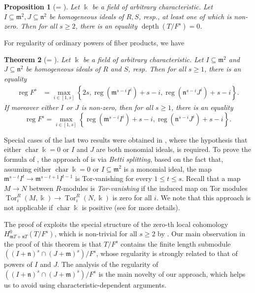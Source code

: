 \documentclass{amsart}
\DeclareMathOperator{\chara}{char}
\DeclareMathOperator{\depth}{depth}
\DeclareMathOperator{\reg}{reg}
\DeclareMathOperator{\Tor}{Tor}
\newcommand{\mm}{\mathfrak{m}}
\newcommand{\nn}{\mathfrak{n}}
\theoremstyle{plain}
\newtheorem{thm}{Theorem}[section]
\newtheorem{prop}[thm]{Proposition}
\theoremstyle{definition}
\numberwithin{equation}{section}
\newcommand{\kk}{\Bbbk}
\begin{document}
\begin{prop}[= ]
\label{prop_depthordinarypower_main}
Let $\kk$ be a field of arbitrary characteristic. Let $I\subseteq \mm^2, J\subseteq \nn^2$ be homogeneous ideals of $R,S$, resp., at least one of which is non-zero. Then for all $s\ge 2$, there is an equality $\depth(T/F^s)=0$.
\end{prop}

For regularity of ordinary powers of fiber products, we have

\begin{thm}[= ]
\label{thm_regordinarypow_main}
Let $\kk$ be a field of arbitrary characteristic. Let $I\subseteq \mm^2$ and $J\subseteq \nn^2$ be homogeneous ideals of $R$ and $S$, resp. Then for  all $s\ge 1$, there is an equality
\begin{align*}
\reg F^s &= \max \limits_{i\in [1,s]} \left\{2s,\reg(\mm^{s-i}I^i)+s-i, \reg(\nn^{s-i}J^i)+s-i\right\}.
\end{align*}
If moreover either $I$ or $J$ is non-zero, then for all $s\ge 1$, there is an equality
\[
\reg F^s = \max \limits_{i\in [1,s]} \left\{\reg(\mm^{s-i}I^i)+s-i, \reg(\nn^{s-i}J^i)+s-i\right\}.
\]
\end{thm}
Special cases of the last two results were obtained in \cite[Theorems 5.1 and 6.1]{NgV19b}, where the hypothesis that either $\chara \kk=0$ or $I$ and $J$ are both monomial ideals, is required. To prove the formula of , the approach of \cite{NgV19b} is via \emph{Betti splitting}, based on the fact that, assuming either $\chara \kk=0$ or $I\subseteq \mm^2$ is a monomial ideal, the map $\mm^{s-t}I^t\to \mm^{s-t+1}I^{t-1}$ is Tor-vanishing for every $1\le t\le s$. Recall that a map $M\to N$ between $R$-modules is \emph{Tor-vanishing} if the induced map on Tor modules $\Tor^R_i(M,\kk)\to \Tor^R_i(N,\kk)$ is zero for all $i$. We note that this approach is not applicable if $\chara \kk$ is positive (see  for more details).

The proof of  exploits the special structure of the zero-th local cohomology $H^0_{\mm T+\nn T}(T/F^s)$, which is non-trivial for all $s\ge 2$ by . Our main observation in the proof of this theorem is that $T/F^s$ contains the finite length submodule $\left((I+\nn)^s\cap (J+\mm)^s\right)/F^s$, whose regularity is strongly related to that of powers of $I$ and $J$. The analysis of the regularity of $\left((I+\nn)^s\cap (J+\mm)^s\right)/F^s$ is the main novelty of our approach, which helps us to avoid using characteristic-dependent arguments.
\end{document}
